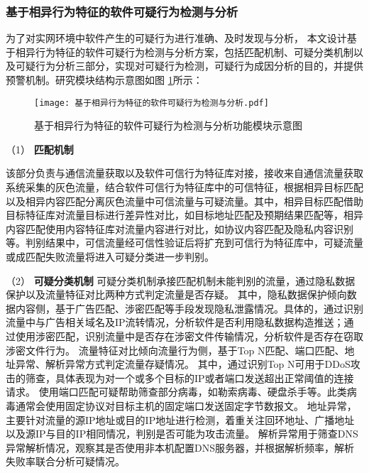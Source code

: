 \subsubsection{基于相异行为特征的软件可疑行为检测与分析}

为了对实网环境中软件产生的可疑行为进行准确、及时发现与分析，
本文设计基于相异行为特征的软件可疑行为检测与分析方案，包括匹配机制、可疑分类机制以及可疑行为分析三部分，实现对可疑行为检测，可疑行为成因分析的目的，并提供预警机制。研究模块结构示意图如图 \ref{fig:基于相异行为特征的软件可疑行为检测与分析}所示：

\FloatBarrier
 
\begin{figure}[ht]
  \centering
  \texttt{[image: 基于相异行为特征的软件可疑行为检测与分析.pdf]}
  \caption{基于相异行为特征的软件可疑行为检测与分析功能模块示意图}
  \label{fig:基于相异行为特征的软件可疑行为检测与分析}
\end{figure} 

\FloatBarrier

（1） \textbf{匹配机制}\quad

该部分负责与通信流量获取以及软件可信行为特征库对接，接收来自通信流量获取系统采集的灰色流量，结合软件可信行为特征库中的可信特征，根据相异目标匹配以及相异内容匹配分离灰色流量中可信流量与可疑流量。其中，相异目标匹配借助目标特征库对流量目标进行差异性对比，如目标地址匹配及预期结果匹配等，相异内容匹配使用内容特征库对流量内容进行对比，如协议内容匹配及隐私内容识别等。判别结果中，可信流量经可信性验证后将扩充到可信行为特征库中，可疑流量或成匹配失败流量将进入可疑分类进一步判别。

（2） \textbf{可疑分类机制}\quad
可疑分类机制承接匹配机制未能判别的流量，通过隐私数据保护以及流量特征对比两种方式判定流量是否存疑。
其中，隐私数据保护倾向数据内容侧，基于广告匹配、涉密匹配等手段发现隐私泄露情况。具体的，通过识别流量中与广告相关域名及IP流转情况，分析软件是否利用隐私数据构造推送；通过使用涉密匹配，识别流量中是否存在涉密文件传输情况，分析软件是否存在窃取涉密文件行为。
流量特征对比倾向流量行为侧，基于Top N匹配、端口匹配、地址异常、解析异常方式判定流量存疑情况。
其中，通过识别Top N可用于DDoS攻击的筛查，具体表现为对一个或多个目标的IP或者端口发送超出正常阈值的连接请求。
使用端口匹配可疑帮助筛查部分病毒，如勒索病毒、硬盘杀手等。此类病毒通常会使用固定协议对目标主机的固定端口发送固定字节数报文。
地址异常，主要针对流量的源IP地址或目的IP地址进行检测，着重关注回环地址、广播地址以及源IP与目的IP相同情况，判别是否可能为攻击流量。
解析异常用于筛查DNS异常解析情况，观察其是否使用非本机配置DNS服务器，并根据解析频率，解析失败率联合分析可疑情况。
 
